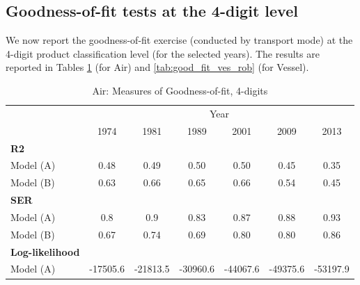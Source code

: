 \documentclass[a4paper,11pt]{article}
\begin{document}
\subsection{Goodness-of-fit tests at the 4-digit level}

We now report the goodness-of-fit exercise (conducted by transport mode) at the 4-digit product classification level (for the selected years). The results are reported in Tables \ref{tab:good_fit_air_rob} (for Air) and \ref{tab:good_fit_ves_rob} (for Vessel).
\begin{table}[htbp]
  \centering
  \caption{Air: Measures of Goodness-of-fit, 4-digits}
\begin{center}
\label{tab:good_fit_air_rob}%
  \footnotesize{
\begin{tabular}{l|cccccc}
\hline
\hline
      & \multicolumn{6}{c}{Year}              \\
      & \multicolumn{1}{c}{1974} & \multicolumn{1}{c}{1981} & \multicolumn{1}{c}{1989} & \multicolumn{1}{c}{2001} & \multicolumn{1}{c}{2009} & \multicolumn{1}{c}{2013}  \\
\hline
\textbf{R2} & \multicolumn{1}{c}{} & \multicolumn{1}{c}{} & \multicolumn{1}{c}{} &       &       &      \\
Model (A)& \multicolumn{1}{c}{0.48} & \multicolumn{1}{c}{0.49} & \multicolumn{1}{c}{0.50} & \multicolumn{1}{c}{0.50} & \multicolumn{1}{c}{0.45} & \multicolumn{1}{c}{0.35} \\
Model (B) & \multicolumn{1}{c}{0.63} & \multicolumn{1}{c}{0.66} & \multicolumn{1}{c}{0.65} & \multicolumn{1}{c}{0.66} & \multicolumn{1}{c}{0.54} & \multicolumn{1}{c}{0.45} \\
\textbf{SER} & \multicolumn{1}{c}{} & \multicolumn{1}{c}{} & \multicolumn{1}{c}{} &       & \multicolumn{1}{c}{} & \multicolumn{1}{c}{}  \\
Model (A)& \multicolumn{1}{c}{0.8} & \multicolumn{1}{c}{0.9} & \multicolumn{1}{c}{0.83} &   0.87    & \multicolumn{1}{c}{0.88} & \multicolumn{1}{c}{0.93}  \\
Model (B) & \multicolumn{1}{c}{0.67} & \multicolumn{1}{c}{0.74} & \multicolumn{1}{c}{0.69} &  0.80     & \multicolumn{1}{c}{0.80} & \multicolumn{1}{c}{0.86}  \\
\textbf{Log-likelihood} & \multicolumn{1}{c}{} & \multicolumn{1}{c}{} & \multicolumn{1}{c}{} &       & \multicolumn{1}{c}{} & \multicolumn{1}{c}{} \\
Model (A) & \multicolumn{1}{c}{-17505.6} & \multicolumn{1}{c}{-21813.5} & \multicolumn{1}{c}{-30960.6} & \multicolumn{1}{c}{-44067.6} & \multicolumn{1}{c}{-49375.6} & \multicolumn{1}{c}{-53197.9}  \\

\end{tabular}}
\end{center}
\end{table}
\end{document}
